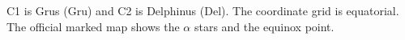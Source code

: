 C1 is Grus (Gru) and C2 is Delphinus (Del). The coordinate grid is equatorial. The official marked map shows the $\alpha$ stars and the equinox point.
